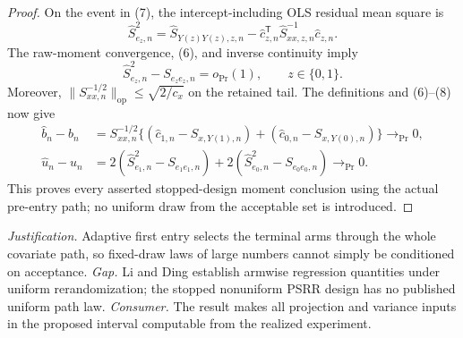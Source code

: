 \documentclass{article}
\begin{document}
\begin{proof}
On the event in (7), the intercept-including OLS residual mean square is
\[
 \widehat S_{e_z,n}^2
 =\widehat S_{Y(z)Y(z),z,n}
  -\widehat c_{z,n}^{\mathsf T}
   \widehat S_{xx,z,n}^{-1}\widehat c_{z,n}.
\]
The raw-moment convergence, (6), and inverse continuity imply
\[
 \widehat S_{e_z,n}^2-S_{e_ze_z,n}=o_{\Pr}(1),
 \qquad z\in\{0,1\}. \tag{8}
\]
Moreover, \(\|S_{xx,n}^{-1/2}\|_{\mathrm{op}}\le\sqrt{2/c_x}\) on the retained tail.  The definitions and (6)--(8) now give
\[
 \begin{aligned}
 \widehat b_n-b_n
 &=S_{xx,n}^{-1/2}\bigl\{(\widehat c_{1,n}-S_{x,Y(1),n})
 +(\widehat c_{0,n}-S_{x,Y(0),n})\bigr\}
 \longrightarrow_{\Pr}0,\\
 \widehat u_n-u_n
 &=2(\widehat S_{e_1,n}^2-S_{e_1e_1,n})
  +2(\widehat S_{e_0,n}^2-S_{e_0e_0,n})
 \longrightarrow_{\Pr}0. \tag{9}
 \end{aligned}
\]
This proves every asserted stopped-design moment conclusion using the actual pre-entry path; no uniform draw from the acceptable set is introduced.
\end{proof}
\par\smallskip\noindent \textit{Justification.} Adaptive first entry selects the terminal arms through the whole covariate path, so fixed-draw laws of large numbers cannot simply be conditioned on acceptance. \textit{Gap.} Li and Ding establish armwise regression quantities under uniform rerandomization; the stopped nonuniform PSRR design has no published uniform path law. \textit{Consumer.} The result makes all projection and variance inputs in the proposed interval computable from the realized experiment.
\end{document}
